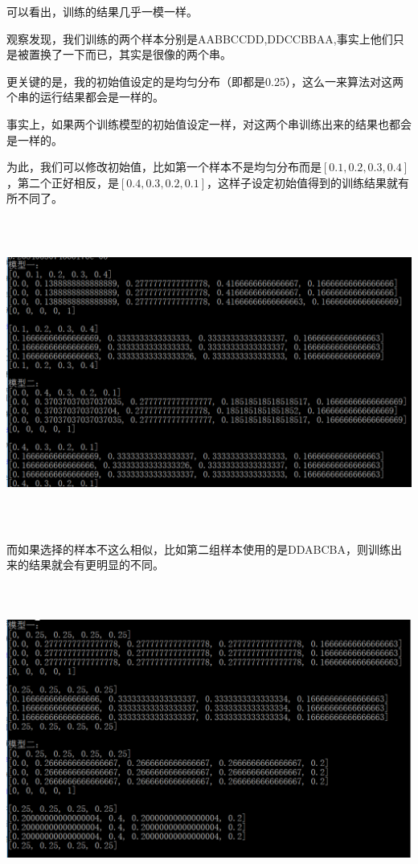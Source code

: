 \documentclass{ctexart}
\begin{document}
可以看出，训练的结果几乎一模一样。

观察发现，我们训练的两个样本分别是AABBCCDD,DDCCBBAA,事实上他们只是被置换了一下而已，其实是很像的两个串。

更关键的是，我的初始值设定的是均匀分布（即都是0.25），这么一来算法对这两个串的运行结果都会是一样的。

事实上，如果两个训练模型的初始值设定一样，对这两个串训练出来的结果也都会是一样的。

为此，我们可以修改初始值，比如第一个样本不是均匀分布而是$[0.1,0.2,0.3,0.4]$，第二个正好相反，是$[0.4,0.3,0.2,0.1]$，这样子设定初始值得到的训练结果就有所不同了。

\includegraphics[width=6in,height=4in]{4.png}

而如果选择的样本不这么相似，比如第二组样本使用的是DDABCBA，则训练出来的结果就会有更明显的不同。

\includegraphics[width=6in,height=4in]{5.png}
\end{document}

